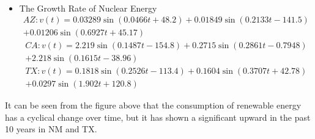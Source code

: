 \begin{itemize}
\begin{multline}
   \end{multline}
   \item The Growth Rate of Nuclear Energy\\
   \begin{multline}
   AZ:v(t)=0.03289\sin(0.0466t+48.2)+0.01849\sin(0.2133t-141.5)\\+0.01206\sin(0.6927t+45.17)%
   \end{multline}
   \begin{multline}
   CA:v(t)=2.219\sin(0.1487t-154.8)+0.2715\sin(0.2861t-0.7948)\\+2.218\sin(0.1615t-38.96)%
   \end{multline}
   \begin{multline}
   TX:v(t)=0.1818\sin(0.2526t-113.4)+0.1604\sin(0.3707t+42.78)\\+0.0297\sin(1.902t+120.8)%
   \end{multline}
\end{itemize}
It can be seen from the figure above that the consumption of renewable energy has a cyclical change over time, but it has shown a significant upward in the past 10 years in NM and TX. 
